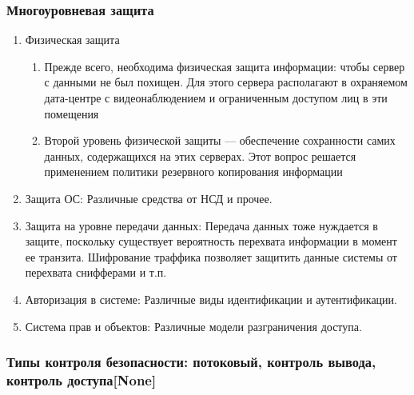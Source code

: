 \subsubsection{Многоуровневая защита}
\begin{enumerate}
	\item Физическая защита
	\begin{enumerate}
		\item Прежде всего, необходима физическая защита информации: чтобы сервер с данными не был похищен. Для этого сервера располагают в охраняемом дата-центре с видеонаблюдением и ограниченным доступом лиц в эти помещения
		\item Второй уровень физической защиты — обеспечение сохранности самих данных, содержащихся на этих серверах. Этот вопрос решается применением политики резервного копирования информации
	\end{enumerate}
	\item Защита ОС: Различные средства от НСД и прочее.
	
	\item Защита на уровне передачи данных: Передача данных тоже нуждается в защите, поскольку существует вероятность перехвата информации в момент ее транзита. Шифрование траффика позволяет защитить данные системы от перехвата снифферами и т.п.
	
	\item Авторизация в системе: Различные виды идентификации и аутентификации.
	
	\item Система прав и объектов: Различные модели разграничения доступа.
\end{enumerate}

\subsubsection{Типы контроля безопасности: потоковый, контроль вывода, контроль доступа[None]}